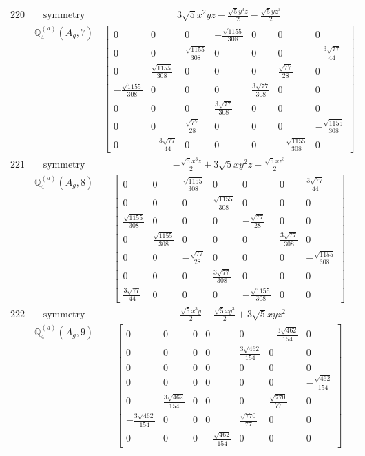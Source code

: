 \documentclass[fleqn,8pt,landscape]{jsarticle}
\begin{document}
\begin{longtable}{ccc}
$ 220 $ & $ \text{symmetry} $ & $ 3 \sqrt{5} x^{2} y z - \frac{\sqrt{5} y^{3} z}{2} - \frac{\sqrt{5} y z^{3}}{2} $ \\
$  $ & $ \mathbb{Q}_{4}^{(a)}(A_{g},7) $ & $ \begin{bmatrix} 0 & 0 & 0 & - \frac{\sqrt{1155}}{308} & 0 & 0 & 0 \\ 0 & 0 & \frac{\sqrt{1155}}{308} & 0 & 0 & 0 & - \frac{3 \sqrt{77}}{44} \\ 0 & \frac{\sqrt{1155}}{308} & 0 & 0 & 0 & \frac{\sqrt{77}}{28} & 0 \\ - \frac{\sqrt{1155}}{308} & 0 & 0 & 0 & \frac{3 \sqrt{77}}{308} & 0 & 0 \\ 0 & 0 & 0 & \frac{3 \sqrt{77}}{308} & 0 & 0 & 0 \\ 0 & 0 & \frac{\sqrt{77}}{28} & 0 & 0 & 0 & - \frac{\sqrt{1155}}{308} \\ 0 & - \frac{3 \sqrt{77}}{44} & 0 & 0 & 0 & - \frac{\sqrt{1155}}{308} & 0 \end{bmatrix} $ \\ \hline
$ 221 $ & $ \text{symmetry} $ & $ - \frac{\sqrt{5} x^{3} z}{2} + 3 \sqrt{5} x y^{2} z - \frac{\sqrt{5} x z^{3}}{2} $ \\
$  $ & $ \mathbb{Q}_{4}^{(a)}(A_{g},8) $ & $ \begin{bmatrix} 0 & 0 & \frac{\sqrt{1155}}{308} & 0 & 0 & 0 & \frac{3 \sqrt{77}}{44} \\ 0 & 0 & 0 & \frac{\sqrt{1155}}{308} & 0 & 0 & 0 \\ \frac{\sqrt{1155}}{308} & 0 & 0 & 0 & - \frac{\sqrt{77}}{28} & 0 & 0 \\ 0 & \frac{\sqrt{1155}}{308} & 0 & 0 & 0 & \frac{3 \sqrt{77}}{308} & 0 \\ 0 & 0 & - \frac{\sqrt{77}}{28} & 0 & 0 & 0 & - \frac{\sqrt{1155}}{308} \\ 0 & 0 & 0 & \frac{3 \sqrt{77}}{308} & 0 & 0 & 0 \\ \frac{3 \sqrt{77}}{44} & 0 & 0 & 0 & - \frac{\sqrt{1155}}{308} & 0 & 0 \end{bmatrix} $ \\ \hline
$ 222 $ & $ \text{symmetry} $ & $ - \frac{\sqrt{5} x^{3} y}{2} - \frac{\sqrt{5} x y^{3}}{2} + 3 \sqrt{5} x y z^{2} $ \\
$  $ & $ \mathbb{Q}_{4}^{(a)}(A_{g},9) $ & $ \begin{bmatrix} 0 & 0 & 0 & 0 & 0 & - \frac{3 \sqrt{462}}{154} & 0 \\ 0 & 0 & 0 & 0 & \frac{3 \sqrt{462}}{154} & 0 & 0 \\ 0 & 0 & 0 & 0 & 0 & 0 & 0 \\ 0 & 0 & 0 & 0 & 0 & 0 & - \frac{\sqrt{462}}{154} \\ 0 & \frac{3 \sqrt{462}}{154} & 0 & 0 & 0 & \frac{\sqrt{770}}{77} & 0 \\ - \frac{3 \sqrt{462}}{154} & 0 & 0 & 0 & \frac{\sqrt{770}}{77} & 0 & 0 \\ 0 & 0 & 0 & - \frac{\sqrt{462}}{154} & 0 & 0 & 0 \end{bmatrix} $ \\ \hline

\end{longtable}
\end{document}
